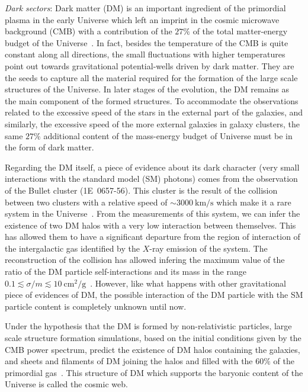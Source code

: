 \documentclass[a4paper,10pt,epsfig,epsf,amsfonts,amsmath]{article}
\begin{document}
\begin{old}
\textit{Dark sectors}: Dark matter (DM) is an important ingredient of
the primordial plasma in the early Universe which left an imprint in
the cosmic microwave background (CMB) with a contribution of the
$27\%$ of the total matter-energy budget of the
Universe~\cite{Aghanim:2018eyx}.
In fact, besides the temperature of the CMB is quite constant along all
directions, the small fluctuations with higher temperatures point out
towards  gravitational potential-wells driven by dark matter.
They are the seeds to capture all the material required for the
formation of the large scale structures of the Universe.
In later stages of the evolution, the DM remains as the main component
of the formed structures. To accommodate the observations related to the excessive
speed of the stars in the external part of the galaxies, and similarly, the
excessive speed of the more external galaxies in galaxy clusters,
the same $27\%$ additional content of the mass-energy budget of Universe
must be in the form of dark matter.

Regarding the DM itself, a piece of evidence about its dark character (very
small interactions with the standard model (SM) photons) comes from
the observation of the Bullet cluster (1E~0657-56).
This cluster is the result of the collision between two clusters with
a relative speed of $\sim 3000~\text{km/s}$ which make it a rare system in the
Universe~\cite{Bouillot:2014hda, Kraljic:2014soa,Thompson:2014zra}.
From the measurements of this system, we can
infer the existence of two DM halos with a very low interaction between
themselves. This has allowed them to have a significant
departure from the region of interaction of the intergalactic gas
identified by the $X$-ray emission of the system.  The reconstruction
of the collision has allowed infering the maximum value of the ratio
of the DM particle self-interactions and its mass in the range
$0.1\lesssim \sigma/m\lesssim 10~\text{cm}^2/\text{g}$~\cite{Spergel:1999mh,
  Wandelt:2000ad, Vogelsberger:2012ku, Rocha:2012jg, Peter:2012jh,
  Zavala:2012us, Vogelsberger:2014pda, Elbert:2014bma,
  Kaplinghat:2015aga}.  However, like what happens with other
gravitational piece of evidences of DM, the possible interaction of the DM
particle with the SM particle content is completely unknown until
now.


Under the hypothesis that the DM is formed by
non-relativistic particles, large scale structure formation
simulations, based on the initial conditions given by the CMB power
spectrum, predict the existence of DM halos containing the galaxies,
and sheets and filaments of DM joining the halos and filled with the
$60\%$ of the primordial gas~\cite{Rodriguez:2018mjb}.
This structure of DM which supports the baryonic content of the
Universe is called the cosmic web.


\end{old}
\end{document}
